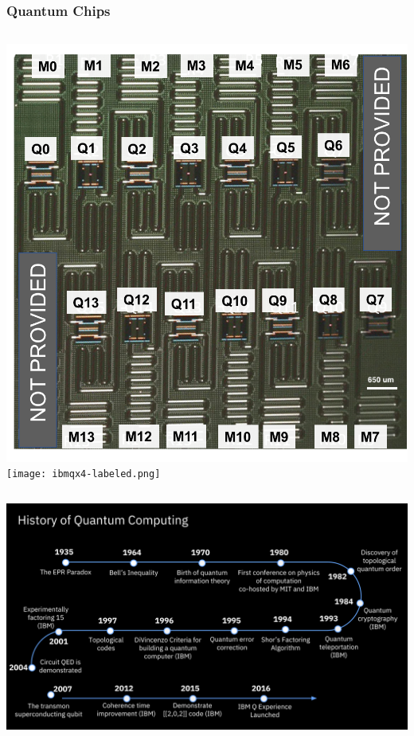 \documentclass[aspectratio=169,11pt,hyperref={colorlinks=true}]{beamer}
\begin{document}
\begin{frame}
    \frametitle{Quantum Chips}
    \begin{columns}
            \includegraphics[width=\textwidth]{melbourne-labeled.png}
            \texttt{[image: ibmqx4-labeled.png]}
    \end{columns}
\end{frame}

\begin{frame}
    \includegraphics[width=\textwidth]{timeline.png}
\end{frame}
\end{document}
